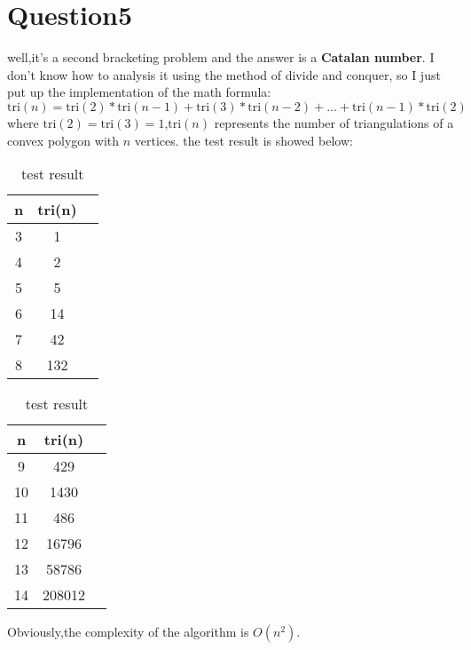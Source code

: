 \section{Question5}
\qquad well,it's a second bracketing problem and the answer is a \textbf{Catalan number}.
I don't know how to analysis it  using the method of divide and conquer,
so I just put up the implementation of the math formula:
\begin{equation*}
\text{tri}(n) = \text{tri}(2)*\text{tri}(n-1) + \text{tri}(3)*\text{tri}(n-2) + ... +\text{tri}(n-1)*\text{tri}(2)
\end{equation*} 
where $\text{tri}(2) = \text{tri}(3) = 1$,$\text{tri}(n)$ represents the number of triangulations of a convex polygon with $n$ vertices.
the test result is showed below: \\
\begin{table}[H]
	\centering
	\begin{tabular}{ccc}
	\toprule
	n & tri(n) \\
	\midrule
	3 &	1 \\
	4 &	2 \\
	5 &	5 \\
	6 &	14 \\
	7 &	42 \\
	8 &	132 \\
	\bottomrule
	\end{tabular}
	\qquad 
	\begin{tabular}{ccc}
	\toprule
	n & tri(n) \\
	\midrule
	9 &	429 \\
	10 &1430 \\
	11 &486 \\
	12 &16796 \\
	13 &58786 \\
	14 & 208012 \\
	\bottomrule	
	\end{tabular}
	\caption{test result}
\end{table}
Obviously,the complexity of the algorithm is $O(n^{2})$.